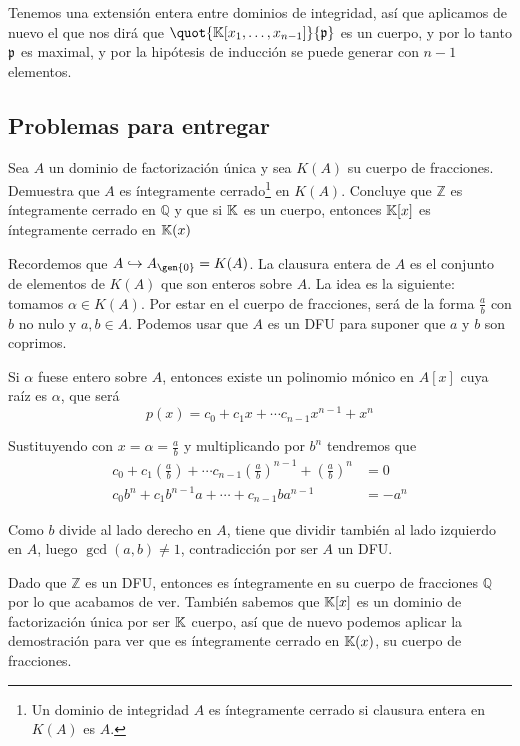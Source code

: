 \begin{problem}[11]
\spart

Tenemos una extensión entera entre dominios de integridad, así que aplicamos de nuevo el  que nos dirá que $ \quot{\K[x_1, \dotsc, x_{n-1}]}{\pideal}$ es un cuerpo, y por lo tanto $\mathfrak{p}$ es maximal, y por la hipótesis de inducción se puede generar con $n-1$ elementos.

\spart



\end{problem}

\subsection{Problemas para entregar}

\begin{problem}[1] Sea $A$ un dominio de factorización única y sea $K(A)$ su cuerpo de fracciones. Demuestra que $A$ es íntegramente cerrado\footnote{Un dominio de integridad $A$ es íntegramente cerrado si clausura entera en $K(A)$ es $A$.} en $K(A)$. Concluye que $ℤ$ es íntegramente cerrado en $ℚ$ y que si $\mathbb{K}$ es un cuerpo, entonces $\mathbb{K}[x]$ es íntegramente cerrado en $\mathbb{K}(x)$

\solution

Recordemos que $A \hookrightarrow A_{\gen{0}} = K(A)$. La clausura entera de $A$ es el conjunto de elementos de $K(A)$ que son enteros sobre $A$. La idea es la siguiente: tomamos $α ∈ K(A)$. Por estar en el cuerpo de fracciones, será de la forma $\frac{a}{b}$ con $b$ no nulo y $a,b ∈ A$. Podemos usar que $A$ es un DFU para suponer que $a$ y $b$ son coprimos.

Si $α$ fuese entero sobre $A$, entonces existe un polinomio mónico en $A[x]$ cuya raíz es $α$, que será \[ p(x) = c_0 + c_1 x + \dotsb c_{n-1} x^{n-1} + x^n \]

Sustituyendo con $x = α = \frac{a}{b}$ y multiplicando por $b^n$ tendremos que \begin{align*}
c_0 + c_1 \left(\frac{a}{b}\right) + \dotsb c_{n-1} \left(\frac{a}{b}\right)^{n-1} + \left(\frac{a}{b}\right)^n &= 0 \\
c_0 b^n + c_1 b^{n-1} a + \dotsb + c_{n-1} b a^{n-1} &= - a^n
\end{align*}

Como $b$ divide al lado derecho en $A$, tiene que dividir también al lado izquierdo en $A$, luego $\gcd (a,b) ≠ 1$, contradicción por ser $A$ un DFU.

Dado que $ℤ$ es un DFU, entonces es íntegramente en su cuerpo de fracciones $ℚ$ por lo que acabamos de ver. También sabemos que $\mathbb{K}[x]$ es un dominio de factorización única por ser $\mathbb{K}$ cuerpo, así que de nuevo podemos aplicar la demostración para ver que es íntegramente cerrado en $\mathbb{K}(x)$, su cuerpo de fracciones.

\end{problem}


